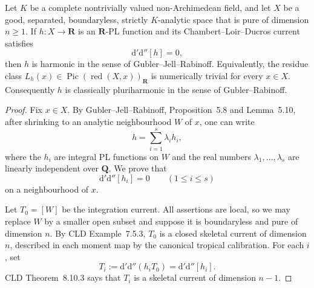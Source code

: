 \begin{proposition}
Let $K$ be a complete nontrivially valued non-Archimedean field, and let
$X$ be a good, separated, boundaryless, strictly $K$-analytic space that is
pure of dimension $n\geq1$.  If $h:X\to\mathbf R$ is an $\mathbf R$-PL
function and its Chambert--Loir--Ducros current satisfies
\[
                         \mathrm d'\mathrm d''[h]=0,
\]
then $h$ is harmonic in the sense of Gubler--Jell--Rabinoff.  Equivalently,
the residue class $L_h(x)\in\operatorname{Pic}(\operatorname{red}(X,x))_
{\mathbf R}$ is numerically trivial for every $x\in X$.  Consequently $h$
is classically pluriharmonic in the sense of Gubler--Rabinoff.
\end{proposition}

\begin{proof}
Fix $x\in X$.  By Gubler--Jell--Rabinoff, Proposition~5.8 and
Lemma~5.10, after shrinking to an analytic neighbourhood $W$ of $x$, one
can write
\begin{equation}
\label{eq:p06r2-independent}
                         h=\sum_{i=1}^{s}\lambda_i h_i,
\end{equation}
where the $h_i$ are integral PL functions on $W$ and the real numbers
$\lambda_1,\ldots,\lambda_s$ are linearly independent over $\mathbf Q$.
We prove that
\begin{equation}
\label{eq:p06r2-integral-currents}
                         \mathrm d'\mathrm d''[h_i]=0
                         \qquad(1\leq i\leq s)
\end{equation}
on a neighbourhood of $x$.

Let $T_0=[W]$ be the integration current.  All assertions are local, so we
may replace $W$ by a smaller open subset and suppose it is boundaryless and
pure of dimension $n$.  By CLD Example~7.5.3, $T_0$ is a closed skeletal
current of dimension $n$, described in each moment map by the canonical
tropical calibration.  For each $i$, set
\[
                         T_i:=\mathrm d'\mathrm d''(h_iT_0)
                             =\mathrm d'\mathrm d''[h_i].
\]
CLD Theorem~8.10.3 says that $T_i$ is a skeletal current of dimension
$n-1$.


\end{proof}
